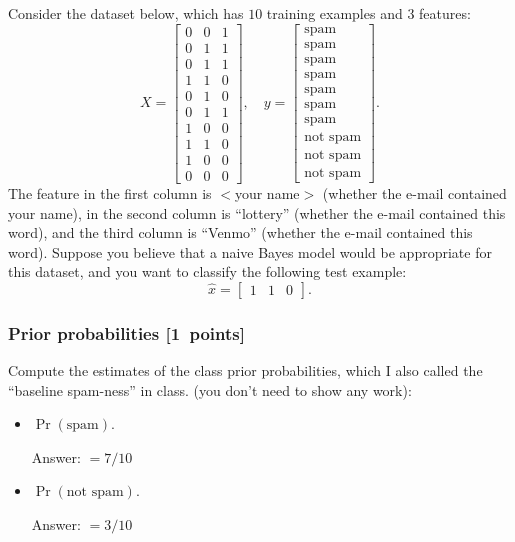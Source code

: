 \documentclass{article}
\newcommand{\blu}[1]{{\textcolor{blu}{#1}}}
\newenvironment{answer}{\par\begingroup\color{gre}Answer: }{\endgroup}
\let\ask\blu
\newcommand\pts[1]{\textcolor{pointscolour}{[#1~points]}}
\begin{document}
    Consider the dataset below, which has $10$ training examples and $3$ features:
    \[
    X = \begin{bmatrix}
        0 & 0 & 1\\
        0 & 1 & 1\\
        0 & 1 & 1\\
        1 & 1 & 0\\
        0 & 1 & 0\\
        0 & 1 & 1\\
        1 & 0 & 0\\
        1 & 1 & 0\\
        1 & 0 & 0\\
        0 & 0 & 0
    \end{bmatrix},
    \quad y = \begin{bmatrix}
        \text{spam}\\
        \text{spam}\\
        \text{spam}\\
        \text{spam}\\
        \text{spam}\\
        \text{spam}\\
        \text{spam}\\
        \text{not spam}\\
        \text{not spam}\\
        \text{not spam}
    \end{bmatrix}.
    \]
    The feature in the first column is $<$your name$>$ (whether the e-mail contained your name), in the second column is ``lottery'' (whether the e-mail contained this word), and the third column is ``Venmo'' (whether the e-mail contained this word).
    Suppose you believe that a naive Bayes model would be appropriate for this dataset, and you want to classify the following test example:
    \[
    \hat{x} = \begin{bmatrix}1 & 1 & 0\end{bmatrix}.
    \]

    \subsubsection{Prior probabilities \pts{1}}
    \ask{Compute the estimates of the class prior probabilities, which I also called the ``baseline spam-ness'' in class.} (you don't need to show any work):
    \begin{itemize}
        \item $\Pr(\text{spam})$.
        \begin{answer}
            $=7/10$
        \end{answer}
        \item $\Pr(\text{not spam})$.\
        \begin{answer}
            $=3/10$
        \end{answer}
    \end{itemize}
\end{document}
